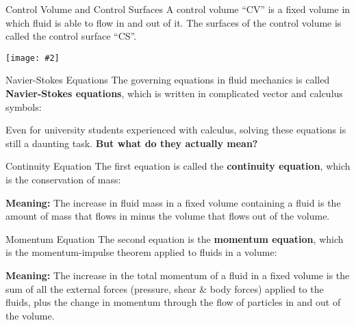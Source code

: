 \documentclass[12pt,aspectratio=169]{beamer}
\newcommand{\pic}[2]{\texttt{[image: \#2]}}
\newcommand{\eq}[2]{\vspace{#1}{\Large\begin{displaymath}#2\end{displaymath}}}
\begin{document}
\begin{frame}{Control Volume and Control Surfaces}
  A control volume ``CV'' is a fixed volume in which fluid is able to flow in
  and out of it. The surfaces of the control volume is called the control
  surface ``CS''.
  \begin{center}
    \pic{.5}{CV-CS}
  \end{center}
\end{frame}



\begin{frame}{Navier-Stokes Equations}
  The governing equations in fluid mechanics is called
  \textbf{Navier-Stokes equations}, which is written in complicated vector
  and calculus symbols:

  Even for university students experienced with calculus, solving these
  equations is still a daunting task. \textbf{But what do they actually mean?}
\end{frame}

\begin{frame}{Continuity Equation}
  The first equation is called the \textbf{continuity equation}, which is the
  conservation of mass:

  \eq{-.2in}{
    \frac{\partial\rho}{\partial t} + \nabla\cdot(\rho\bm{v})=0
  }

  \textbf{Meaning:} The increase in fluid mass in a fixed volume containing a
  fluid is the amount of mass that flows in minus the volume that flows out of
  the volume.
\end{frame}


\begin{frame}{Momentum Equation}
  The second equation is the \textbf{momentum equation}, which is the 
  momentum-impulse theorem applied to fluids in a volume:

  \eq{-.15in}{
    \frac{\partial(\rho\bm{v})}{\partial t} +
    \nabla(\rho\bm{v}\otimes\bm{v}) = -\nabla p +\nabla\cdot\bm{\tau}
    +\rho\bm{g}
  }

  \textbf{Meaning:} The increase in the total momentum of a fluid in a fixed
  volume is the sum of all the external forces (pressure, shear \& body forces)
  applied to the fluids, plus the change in momentum through the flow of
  particles in and out of the volume.
\end{frame}
\end{document}
